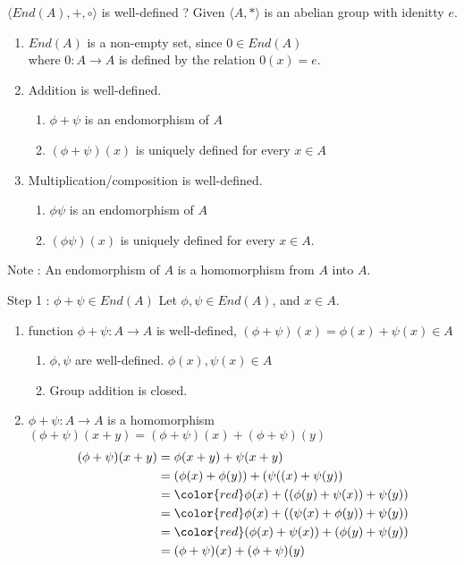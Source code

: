 \documentclass{beamer}
\begin{document}
\begin{frame}{$\langle End(A),+,\circ \rangle$ is well-defined ?}
	Given $\langle A, \ast \rangle$ is an abelian group with idenitty $e$.
\begin{enumerate}
	\item $End(A)$ is a non-empty set, since $0 \in End(A)$\\
		where $0 : A \to A$ is defined by the relation $0(x) = e$.
	\item Addition is well-defined.
	\begin{enumerate}
		\item $\phi+\psi$ is an endomorphism of $A$ 
		\item $(\phi+\psi)(x)$ is uniquely defined for every $x \in A$ 
	\end{enumerate}
	\item Multiplication/composition is well-defined.
	\begin{enumerate}
		\item $\phi\psi$ is an endomorphism of $A$ 
		\item $(\phi\psi)(x)$ is uniquely defined for every $x \in A$.
	\end{enumerate}
\end{enumerate}
	Note : An endomorphism of $A$ is a homomorphism from $A$ into $A$.
\end{frame}

\begin{frame}{Step 1 : $\phi + \psi \in End(A)$}
	Let $\phi,\psi \in End(A)$, and $x \in A$.
	\begin{enumerate}
		\item function $\phi+\psi :A \to A$ is well-defined,
			$(\phi+\psi)(x) = \phi(x)+\psi(x) \in A$
			\begin{enumerate}
				\item $\phi,\psi$ are well-defined. $\phi(x),\psi(x) \in A$
				\item Group addition is closed.
			\end{enumerate}
		\item $\phi + \psi : A \to A$ is a homomorphism
		$(\phi+\psi)(x+y) = (\phi+\psi)(x) + (\phi+\psi)(y)$
	\begin{align}
		(\phi+\psi)(x+y) & =\phi(x+y) + \psi(x+y) \\
		& = (\phi(x)+\phi(y)) + (\psi((x)+\psi(y))\\
		& = {\color{red}\phi(x) + ((\phi(y) + \psi(x))+\psi(y))} \\
		& = {\color{red}\phi(x) + ((\psi(x) + \phi(y))+\psi(y))} \\
		& = {\color{red}(\phi(x) + \psi(x)) + (\phi(y)+\psi(y))} \\
		& = (\phi+\psi)(x) + (\phi+\psi)(y)
	\end{align}
	\end{enumerate}
\end{frame}
\end{document}
